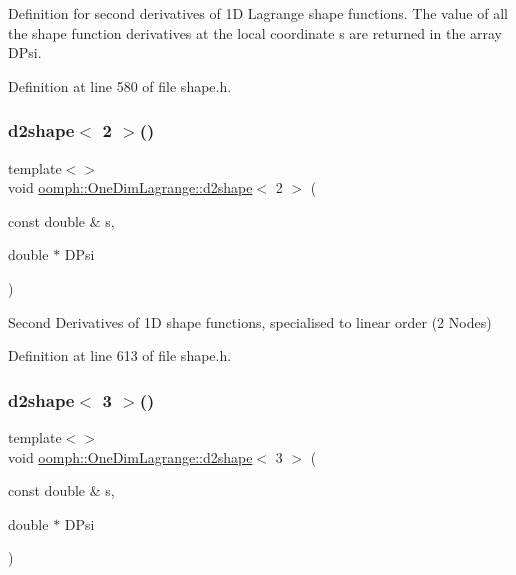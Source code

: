 Definition for second derivatives of 1D Lagrange shape functions. The value of all the shape function derivatives at the local coordinate s are returned in the array D\+Psi. 



Definition at line 580 of file shape.\+h.

\mbox{\label{namespaceoomph_1_1OneDimLagrange_a2ee22e982dfd4a46e5b0b7fd9f627498}} 
\subsubsection{\texorpdfstring{d2shape$<$ 2 $>$()}{d2shape< 2 >()}}
{\footnotesize\ttfamily template$<$$>$ \\
void \hyperlink{namespaceoomph_1_1OneDimLagrange_a9515ce1aa8ef987244c379655c41fa01}{oomph\+::\+One\+Dim\+Lagrange\+::d2shape}$<$ 2 $>$ (\begin{DoxyParamCaption}\item[{const double \&}]{s,  }\item[{double $\ast$}]{D\+Psi }\end{DoxyParamCaption})\hspace{0.3cm}{\ttfamily [inline]}}



Second Derivatives of 1D shape functions, specialised to linear order (2 Nodes) 



Definition at line 613 of file shape.\+h.

\mbox{\label{namespaceoomph_1_1OneDimLagrange_a9ed8561ccff2c23c63807c8c1b62d1a8}} 
\subsubsection{\texorpdfstring{d2shape$<$ 3 $>$()}{d2shape< 3 >()}}
{\footnotesize\ttfamily template$<$$>$ \\
void \hyperlink{namespaceoomph_1_1OneDimLagrange_a9515ce1aa8ef987244c379655c41fa01}{oomph\+::\+One\+Dim\+Lagrange\+::d2shape}$<$ 3 $>$ (\begin{DoxyParamCaption}\item[{const double \&}]{s,  }\item[{double $\ast$}]{D\+Psi }\end{DoxyParamCaption})\hspace{0.3cm}{\ttfamily [inline]}}

